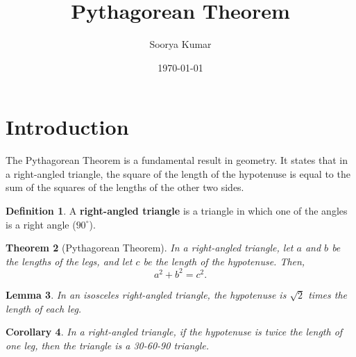 \documentclass{article}
\title{Pythagorean Theorem}
\author{Soorya Kumar}
\date{\today}
\theoremstyle{plain}
\newtheorem{theorem}{Theorem}[section]
\newtheorem{lemma}[theorem]{Lemma}
\newtheorem{corollary}[theorem]{Corollary}
\theoremstyle{definition}
\newtheorem{definition}[theorem]{Definition}
\begin{document}
	\maketitle
	
	\section{Introduction}
	The Pythagorean Theorem is a fundamental result in geometry. It states that in a right-angled triangle, the square of the length of the hypotenuse is equal to the sum of the squares of the lengths of the other two sides.
	
	\begin{definition}
		A \textbf{right-angled triangle} is a triangle in which one of the angles is a right angle (\(90^\circ\)).
	\end{definition}
	
	\begin{theorem}[Pythagorean Theorem] 
		In a right-angled triangle, let \( a \) and \( b \) be the lengths of the legs, and let \( c \) be the length of the hypotenuse. Then,
		\[
		a^2 + b^2 = c^2.
		\]
	\end{theorem}
	
	\begin{lemma}
		In an isosceles right-angled triangle, the hypotenuse is \( \sqrt{2} \) times the length of each leg.
	\end{lemma}
	
	\begin{corollary}
		In a right-angled triangle, if the hypotenuse is twice the length of one leg, then the triangle is a 30-60-90 triangle.
	\end{corollary}
	
\end{document}
